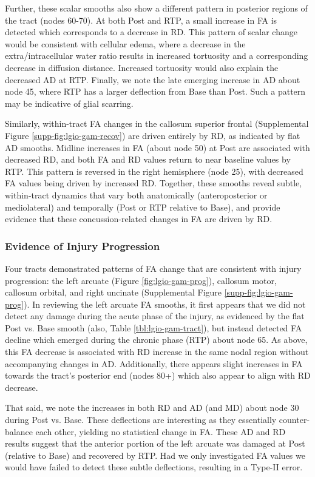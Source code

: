 \documentclass[]{imag-ms-template}
\begin{document}
Further, these scalar smooths also show a different pattern in posterior regions of the tract (nodes 60-70). At both Post and RTP, a small increase in FA is detected which corresponds to a decrease in RD. This pattern of scalar change would be consistent with cellular edema, where a decrease in the extra/intracellular water ratio results in increased tortuosity and a corresponding decrease in diffusion distance. Increased tortuosity would also explain the decreased AD at RTP. Finally, we note the late emerging increase in AD about node 45, where RTP has a larger deflection from Base than Post. Such a pattern may be indicative of glial scarring.

Similarly, within-tract FA changes in the callosum superior frontal (Supplemental Figure \ref{supp-fig:lgio-gam-recov}) are driven entirely by RD, as indicated by flat AD smooths. Midline increases in FA (about node 50) at Post are associated with decreased RD, and both FA and RD values return to near baseline values by RTP. This pattern is reversed in the right hemisphere (node 25), with decreased FA values being driven by increased RD. Together, these smooths reveal subtle, within-tract dynamics that vary both anatomically (anteroposterior or mediolateral) and temporally (Post or RTP relative to Base), and provide evidence that these concussion-related changes in FA are driven by RD.


\subsubsection{Evidence of Injury Progression}
\label{sssec:res-dwi-pat-prog}
Four tracts demonstrated patterns of FA change that are consistent with injury progression: the left arcuate (Figure \ref{fig:lgio-gam-prog}), callosum motor, callosum orbital, and right uncinate (Supplemental Figure \ref{supp-fig:lgio-gam-prog}). In reviewing the left arcuate FA smooths, it first appears that we did not detect any damage during the acute phase of the injury, as evidenced by the flat Post vs. Base smooth (also, Table \ref{tbl:lgio-gam-tract}), but instead detected FA decline which emerged during the chronic phase (RTP) about node 65. As above, this FA decrease is associated with RD increase in the same nodal region without accompanying changes in AD. Additionally, there appears slight increases in FA towards the tract's posterior end (nodes 80+) which also appear to align with RD decrease.

That said, we note the increases in both RD and AD (and MD) about node 30 during Post vs. Base. These deflections are interesting as they essentially counter-balance each other, yielding no statistical change in FA. These AD and RD results suggest that the anterior portion of the left arcuate was damaged at Post (relative to Base) and recovered by RTP. Had we only investigated FA values we would have failed to detect these subtle deflections, resulting in a Type-II error.
\end{document}
